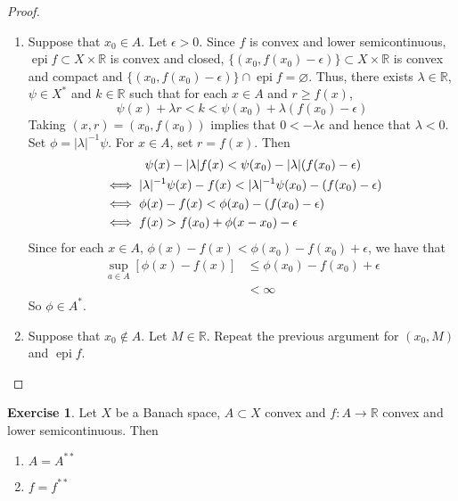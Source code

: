 \documentclass[12pt]{amsart}
\theoremstyle{definition}
\newtheorem{ex}[definition]{Exercise}
\newcommand{\lam}{\lambda}
\newcommand{\ep}{\epsilon}
\newcommand{\R}{\mathbb{R}}
\DeclareMathOperator{\epi}{epi}
\begin{document}
	\begin{proof}\
		\begin{enumerate}
			\item Suppose that $x_0 \in A$. Let $\ep >0$. Since $f$ is convex and lower semicontinuous, $\epi f \subset X \times \R$ is convex and closed, $\{(x_0, f(x_0) - \ep)\} \subset X \times \R$ is convex and compact and $\{(x_0, f(x_0) - \ep)\} \cap \epi f = \varnothing$. Thus, there exists $\lam \in \R$, $\psi \in X^*$ and $k \in \R$ such that for each $x \in A$ and $r \geq f(x)$, 
			$$\psi(x) + \lam r < k < \psi(x_0) + \lam (f(x_0) - \ep)$$
			Taking $(x, r) = (x_0, f(x_0))$ implies that $0 < -\lam \ep $ and hence that $\lam < 0$. Set $\phi = |\lam|^{-1}\psi$. For $x \in A$, set $r = f(x)$. Then 
			\begin{align*}
				& \hspace{1.2cm} \psi(x) -|\lam| f(x) < \psi(x_0) - |\lam| (f(x_0) - \ep) \\
				& \iff |\lam|^{-1} \psi(x) - f(x) < |\lam|^{-1}\psi(x_0) - (f(x_0) - \ep) \\
				& \iff \phi(x) - f(x) < \phi(x_0) - (f(x_0) - \ep) \\
				& \iff f(x) > f(x_0) + \phi(x-x_0) - \ep 
			\end{align*}
			Since for each $x \in A$, $\phi(x) - f(x) < \phi(x_0) - f(x_0) + \ep$, we have that 
			\begin{align*}
				\sup_{a \in A}[\phi(x) - f(x)] 
				& \leq \phi(x_0) - f(x_0) + \ep \\
				&< \infty
			\end{align*}
			So $\phi \in A^*$.
			\item Suppose that $x_0 \not \in A$. Let $M \in \R$. Repeat the previous argument for $(x_0, M)$ and $\epi f$.
		\end{enumerate}
	\end{proof}

	\begin{ex}
		Let $X$ be a Banach space, $A \subset X$ convex and $f:A \rightarrow \R$ convex and lower semicontinuous. Then 
		\begin{enumerate}
			\item $A = A^{**}$
			\item $f = f^{**}$
		\end{enumerate}
	\end{ex}
\end{document}

